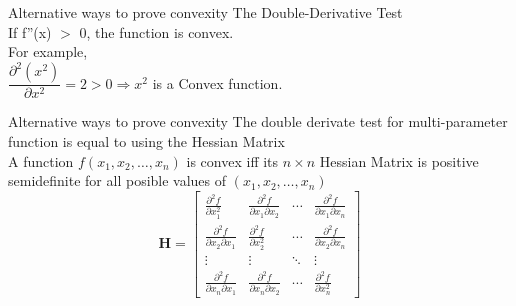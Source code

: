\documentclass{beamer}
\begin{document}
	\begin{frame}{Alternative ways to prove convexity}
	The Double-Derivative Test\\
	\vspace{1cm}
	If f''(x) $>$ 0, the function is  convex.\\
	\vspace{1cm}
	For example,\\
	\vspace{1cm}
	$\dfrac{\partial ^2( x^2)}{\partial x^2} = 2 > 0 \Rightarrow x^2$ is a Convex function.\\  
	\end{frame}

	\begin{frame}{Alternative ways to prove convexity}
	The double derivate test for multi-parameter function is equal to using the Hessian Matrix\\
	\vspace{1cm}
	A function $f(x_1,x_2,\dots,x_n)$ is convex iff its $n \times n$ Hessian Matrix is positive semidefinite for all posible values of $(x_1,x_2,\dots, x_n)$\\
	\begin{equation*}
\mathbf{H}=\left[\begin{array}{cccc}
{\frac{\partial^{2} f}{\partial x_{1}^{2}}} & {\frac{\partial^{2} f}{\partial x_{1} \partial x_{2}}} & {\cdots} & {\frac{\partial^{2} f}{\partial x_{1} \partial x_{n}}} \\
{\frac{\partial^{2} f}{\partial x_{2} \partial x_{1}}} & {\frac{\partial^{2} f}{\partial x_{2}^{2}}} & {\cdots} & {\frac{\partial^{2} f}{\partial x_{2} \partial x_{n}}} \\
{\vdots} & {\vdots} & {\ddots} & {\vdots} \\
{\frac{\partial^{2} f}{\partial x_{n} \partial x_{1}}} & {\frac{\partial^{2} f}{\partial x_{n} \partial x_{2}}} & {\cdots} & {\frac{\partial^{2} f}{\partial x_{n}^{2}}}
\end{array}\right]
\end{equation*}
	\end{frame}
\end{document}
